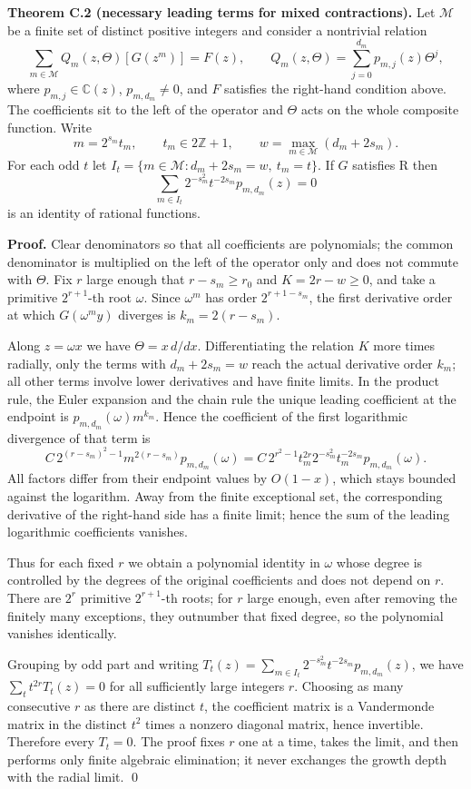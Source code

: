 \documentclass[11pt]{article}
\begin{document}
\textbf{Theorem C.2 (necessary leading terms for mixed contractions).} Let $\mathcal M$ be a finite set of distinct positive integers and consider a nontrivial relation
\[
\sum_{m\in\mathcal M}Q_m(z,\Theta)[G(z^m)]=F(z),
\qquad
Q_m(z,\Theta)=\sum_{j=0}^{d_m}p_{m,j}(z)\Theta^j,
\]
where $p_{m,j}\in\mathbb C(z)$, $p_{m,d_m}\ne0$, and $F$ satisfies the right-hand condition above. The coefficients sit to the left of the operator and $\Theta$ acts on the whole composite function. Write
\[
m=2^{s_m}t_m,\qquad t_m\in2\mathbb Z+1,\qquad w=\max_{m\in\mathcal M}(d_m+2s_m).
\]
For each odd $t$ let $I_t=\{m\in\mathcal M:d_m+2s_m=w,\ t_m=t\}$. If $G$ satisfies R then
\[
\sum_{m\in I_t}2^{-s_m^2}t^{-2s_m}p_{m,d_m}(z)=0
\]
is an identity of rational functions.

\textbf{Proof.} Clear denominators so that all coefficients are polynomials; the common denominator is multiplied on the left of the operator only and does not commute with $\Theta$. Fix $r$ large enough that $r-s_m\ge r_0$ and $K=2r-w\ge0$, and take a primitive $2^{r+1}$-th root $\omega$. Since $\omega^m$ has order $2^{r+1-s_m}$, the first derivative order at which $G(\omega^m y)$ diverges is $k_m=2(r-s_m)$.

Along $z=\omega x$ we have $\Theta=x\,d/dx$. Differentiating the relation $K$ more times radially, only the terms with $d_m+2s_m=w$ reach the actual derivative order $k_m$; all other terms involve lower derivatives and have finite limits. In the product rule, the Euler expansion and the chain rule the unique leading coefficient at the endpoint is $p_{m,d_m}(\omega)m^{k_m}$. Hence the coefficient of the first logarithmic divergence of that term is
\[
C\,2^{(r-s_m)^2-1}m^{2(r-s_m)}p_{m,d_m}(\omega)
=C\,2^{r^2-1}t_m^{2r}2^{-s_m^2}t_m^{-2s_m}p_{m,d_m}(\omega).
\]
All factors differ from their endpoint values by $O(1-x)$, which stays bounded against the logarithm. Away from the finite exceptional set, the corresponding derivative of the right-hand side has a finite limit; hence the sum of the leading logarithmic coefficients vanishes.

Thus for each fixed $r$ we obtain a polynomial identity in $\omega$ whose degree is controlled by the degrees of the original coefficients and does not depend on $r$. There are $2^r$ primitive $2^{r+1}$-th roots; for $r$ large enough, even after removing the finitely many exceptions, they outnumber that fixed degree, so the polynomial vanishes identically.

Grouping by odd part and writing $T_t(z)=\sum_{m\in I_t}2^{-s_m^2}t^{-2s_m}p_{m,d_m}(z)$, we have $\sum_t t^{2r}T_t(z)=0$ for all sufficiently large integers $r$. Choosing as many consecutive $r$ as there are distinct $t$, the coefficient matrix is a Vandermonde matrix in the distinct $t^2$ times a nonzero diagonal matrix, hence invertible. Therefore every $T_t=0$. The proof fixes $r$ one at a time, takes the limit, and then performs only finite algebraic elimination; it never exchanges the growth depth with the radial limit. \qed
\end{document}
